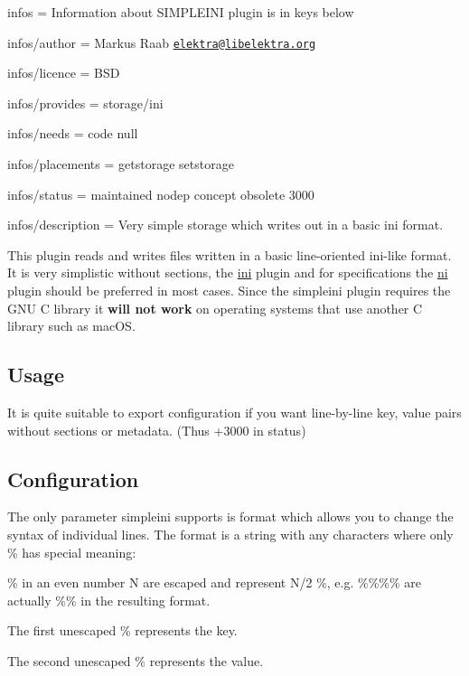 
\begin{DoxyItemize}
\item infos = Information about S\+I\+M\+P\+L\+E\+I\+NI plugin is in keys below
\item infos/author = Markus Raab \href{mailto:elektra@libelektra.org}{\tt elektra@libelektra.\+org}
\item infos/licence = B\+SD
\item infos/provides = storage/ini
\item infos/needs = code null
\item infos/placements = getstorage setstorage
\item infos/status = maintained nodep concept obsolete 3000
\item infos/description = Very simple storage which writes out in a basic ini format.
\end{DoxyItemize}

This plugin reads and writes files written in a basic line-\/oriented ini-\/like format. It is very simplistic without sections, the \hyperlink{md_src_plugins_ini_README_src_plugins_ini_README_md}{ini} plugin and for specifications the \hyperlink{md_src_plugins_ni_README_src_plugins_ni_README_md}{ni} plugin should be preferred in most cases. Since the {\ttfamily simpleini} plugin requires the G\+NU C library it {\bfseries will not work} on operating systems that use another C library such as mac\+OS.

\subsection*{Usage}

It is quite suitable to export configuration if you want line-\/by-\/line key, value pairs without sections or metadata. (Thus +3000 in status) 


\subsection*{Configuration}

The only parameter simpleini supports is {\ttfamily format} which allows you to change the syntax of individual lines. The {\ttfamily format} is a string with any characters where only {\ttfamily \%} has special meaning\+:


\begin{DoxyItemize}
\item {\ttfamily \%} in an even number N are escaped and represent N/2 {\ttfamily \%}, e.\+g. {\ttfamily \%\%\%\%} are actually {\ttfamily \%\%} in the resulting format.
\item The first unescaped {\ttfamily \%} represents the key.
\item The second unescaped {\ttfamily \%} represents the value.
\end{DoxyItemize}

